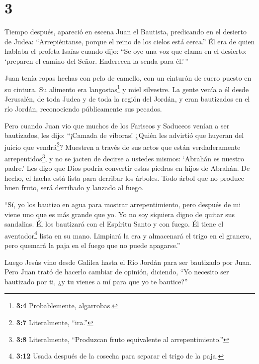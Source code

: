 \hypertarget{section-2}{%
\section{3}\label{section-2}}

 Tiempo después, apareció en escena Juan el Bautista,
predicando en el desierto de Judea:  ``Arrepiéntanse, porque
el reino de los cielos está cerca.''  Él era de quien
hablaba el profeta Isaías cuando dijo: ``Se oye una voz que clama en el
desierto: `preparen el camino del Señor. Enderecen la senda para
él.'\,''

 Juan tenía ropas hechas con pelo de camello, con un
cinturón de cuero puesto en su cintura. Su alimento era
langostas\footnote{\textbf{3:4} Probablemente, algarrobas.} y miel
silvestre.  La gente venía a él desde Jerusalén, de toda
Judea y de toda la región del Jordán,  y eran bautizados en
el río Jordán, reconociendo públicamente sus pecados.

 Pero cuando Juan vio que muchos de los Fariseos y Saduceos
venían a ser bautizados, les dijo: ``¡Camada de víboras! ¿Quién les
advirtió que huyeran del juicio que vendrá\footnote{\textbf{3:7}
  Literalmente, ``ira.''}?  Muestren a través de sus actos
que están verdaderamente arrepentidos\footnote{\textbf{3:8}
  Literalmente, ``Produzcan fruto equivalente al arrepentimiento.''},
 y no se jacten de decirse a ustedes mismos: `Abrahán es
nuestro padre.' Les digo que Dios podría convertir estas piedras en
hijos de Abrahán.  De hecho, el hacha está lista para
derribar los árboles. Todo árbol que no produce buen fruto, será
derribado y lanzado al fuego.

 ``Sí, yo los bautizo en agua para mostrar arrepentimiento,
pero después de mi viene uno que es más grande que yo. Yo no soy
siquiera digno de quitar sus sandalias. Él los bautizará con el Espíritu
Santo y con fuego.  Él tiene el aventador\footnote{\textbf{3:12}
  Usada después de la cosecha para separar el trigo de la paja.} lista
en su mano. Limpiará la era y almacenará el trigo en el granero, pero
quemará la paja en el fuego que no puede apagarse.''

 Luego Jesús vino desde Galilea hasta el Río Jordán para
ser bautizado por Juan.  Pero Juan trató de hacerlo cambiar
de opinión, diciendo, ``Yo necesito ser bautizado por ti, ¿y tu vienes a
mí para que yo te bautice?''

